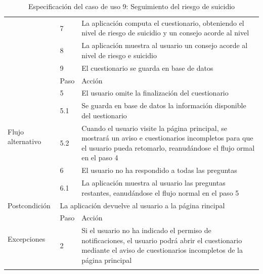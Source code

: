 \begin{table}[h]
\begin{tabularx}{\textwidth}{|l|l|X|}
            \cline{2-3} & 7 & La aplicación computa el cuestionario, obteniendo el nivel de riesgo de suicidio y un consejo acorde al nivel \\
            \cline{2-3} & 8 & La aplicación muestra al usuario un consejo acorde al nivel de riesgo e suicidio \\
            \cline{2-3} & 9 & El cuestionario se guarda en base de datos \\
            \hline
            \multirow{6}{*}{Flujo alternativo} & Paso & Acción \\
            \cline{2-3} & 5 & El usuario omite la finalización del cuestionario \\
            \cline{2-3} & 5.1 & Se guarda en base de datos la información disponible del uestionario \\
            \cline{2-3} & 5.2 & Cuando el usuario visite la página principal, se mostrará un aviso e cuestionarios incompletos para que el usuario pueda retomarlo, reanudándose el flujo ormal en el paso 4 \\
            \cline{2-3} & 6 & El usuario no ha respondido a todas las preguntas \\
            \cline{2-3} & 6.1 & La aplicación muestra al usuario las preguntas restantes, eanudándose el flujo normal en el paso 5 \\
            \hline
            Postcondición & \multicolumn{2}{|X|}{La aplicación devuelve al usuario a la página rincipal} \\
            \hline
            \multirow{2}{*}{Excepciones}  & Paso & Acción \\
            \cline{2-3} & 2 & Si el usuario no ha indicado el permiso de notificaciones, el usuario podrá abrir el cuestionario mediante el aviso de cuestionarios incompletos de la página principal \\
            \hline
            \caption{Especificación del caso de uso 9: Seguimiento del riesgo de suicidio}
            \label{tabla:casos_uso:seguimiento_suicidio}
        \end{tabularx}
    \end{table}

